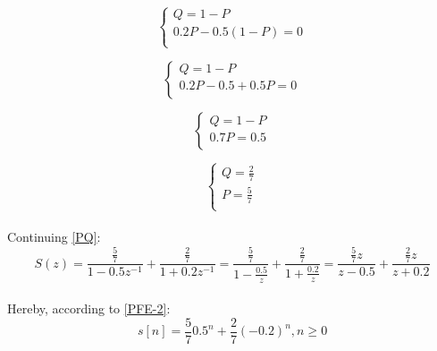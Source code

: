 \documentclass[14pt]{article}
\begin{document}
\begin{equation}
	\left\{  
	\begin{array}{rcl}  
		Q = 1 - P\\  
		0.2 P  -0.5 (1-P) = 0\\    
	\end{array}
	\right.
\end{equation}

\begin{equation}
	\left\{  
	\begin{array}{rcl}  
		Q = 1 - P\\  
		0.2 P - 0.5 + 0.5 P = 0\\    
	\end{array}
	\right.
\end{equation}

\begin{equation}
	\left\{  
	\begin{array}{rcl}  
		Q = 1 - P\\  
		0.7 P = 0.5\\    
	\end{array}
	\right.
\end{equation}

\begin{equation}
	\left\{  
	\begin{array}{rcl}  
		Q = \frac{2}{7}\\  
		P = \frac{5}{7}\\    
	\end{array}
	\right.
\end{equation}

\paragraph{}
Continuing \eqref{PQ}:
\begin{equation}
	S(z)
	=
	\frac{\frac{5}{7}}{1 - 0.5 z^{-1}} 
		+ \frac{\frac{2}{7}}{1 + 0.2 z^{-1}}
	=
	\frac{\frac{5}{7}}{1 - \frac{0.5}{z}} 
		+ \frac{\frac{2}{7}}{1 + \frac{0.2}{z}}
	=
	\frac{\frac{5}{7}z}{z - 0.5} + \frac{\frac{2}{7}z}{z + 0.2}
\end{equation}

\paragraph{}
Hereby, according to \eqref{PFE-2}:
\begin{equation}
	s[n]
	=
	\frac{5}{7} 0.5^n + \frac{2}{7} (-0.2)^n, n \geq 0
\end{equation}
\end{document}
